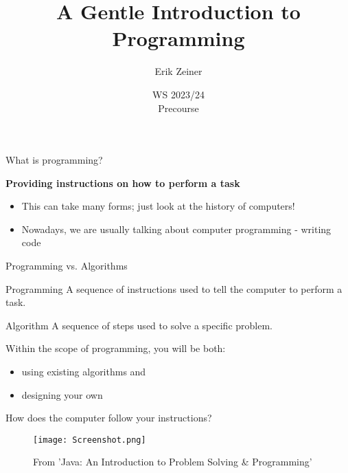 \documentclass[aspectratio=169,hyperref={unicode}]{beamer}
\title{A Gentle Introduction to Programming}
\author{Erik Zeiner}
\institute{Fachschaft General \& Computational Linguistics\\ \textbf{University of Tübingen}}
\date{WS 2023/24 \\ Precourse}
\begin{document}
\frame{\titlepage}
\begin{frame}{What is programming?}

\begin{center}
	\Large\textbf{Providing instructions on how to perform a task}
\end{center}



\begin{itemize}
	\item This can take many forms; just look at the history of computers!
	\item Nowadays, we are usually talking about computer programming - writing code
\end{itemize}
	
\end{frame}
\begin{frame}{Programming vs. Algorithms}
	
\begin{block}{Programming}
	A sequence of instructions used to tell the computer to perform a task.
\end{block}
	
\begin{block}{Algorithm}
	A sequence of steps used to solve a specific problem.
\end{block}
 
\vfill

Within the scope of programming, you will be both:
\begin{itemize}
	\item using existing algorithms and
	\item designing your own
\end{itemize}

\end{frame}

\begin{frame}{How does the computer follow your instructions?}
\begin{figure}
\texttt{[image: Screenshot.png]}  
\caption{From 'Java: An Introduction to Problem Solving \& Programming'}
\end{figure}
\end{frame}
\end{document}
